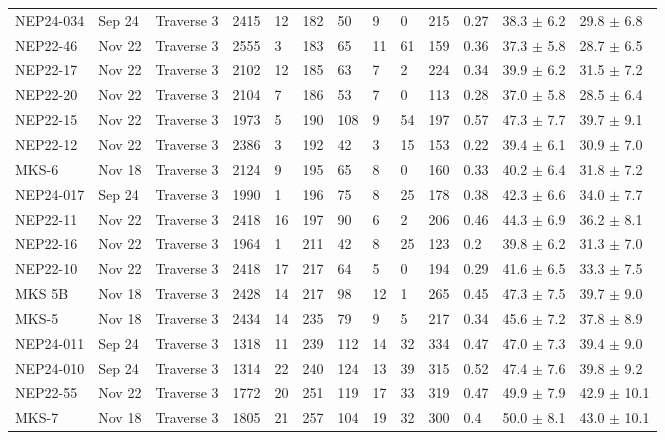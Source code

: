 \begin{landscape}
{\begin{longtable}{l l l l l l l l l l l l l}
    NEP24-034 & Sep 24 & Traverse 3 & 2415 & 12 & 182 & 50 & 9 & 0 & 215 & 0.27 & 38.3 $\pm$ 6.2 & 29.8 $\pm$ 6.8 \\
    NEP22-46 & Nov 22 & Traverse 3 & 2555 & 3 & 183 & 65 & 11 & 61 & 159 & 0.36 & 37.3 $\pm$ 5.8 & 28.7 $\pm$ 6.5 \\
    NEP22-17 & Nov 22 & Traverse 3 & 2102 & 12 & 185 & 63 & 7 & 2 & 224 & 0.34 & 39.9 $\pm$ 6.2 & 31.5 $\pm$ 7.2 \\
    NEP22-20 & Nov 22 & Traverse 3 & 2104 & 7 & 186 & 53 & 7 & 0 & 113 & 0.28 & 37.0 $\pm$ 5.8 & 28.5 $\pm$ 6.4 \\
    NEP22-15 & Nov 22 & Traverse 3 & 1973 & 5 & 190 & 108 & 9 & 54 & 197 & 0.57 & 47.3 $\pm$ 7.7 & 39.7 $\pm$ 9.1 \\
    NEP22-12 & Nov 22 & Traverse 3 & 2386 & 3 & 192 & 42 & 3 & 15 & 153 & 0.22 & 39.4 $\pm$ 6.1 & 30.9 $\pm$ 7.0 \\
    MKS-6 & Nov 18 & Traverse 3 & 2124 & 9 & 195 & 65 & 8 & 0 & 160 & 0.33 & 40.2 $\pm$ 6.4 & 31.8 $\pm$ 7.2 \\
    NEP24-017 & Sep 24 & Traverse 3 & 1990 & 1 & 196 & 75 & 8 & 25 & 178 & 0.38 & 42.3 $\pm$ 6.6 & 34.0 $\pm$ 7.7 \\
    NEP22-11 & Nov 22 & Traverse 3 & 2418 & 16 & 197 & 90 & 6 & 2 & 206 & 0.46 & 44.3 $\pm$ 6.9 & 36.2 $\pm$ 8.1 \\
    NEP22-16 & Nov 22 & Traverse 3 & 1964 & 1 & 211 & 42 & 8 & 25 & 123 & 0.2 & 39.8 $\pm$ 6.2 & 31.3 $\pm$ 7.0 \\
    NEP22-10 & Nov 22 & Traverse 3 & 2418 & 17 & 217 & 64 & 5 & 0 & 194 & 0.29 & 41.6 $\pm$ 6.5 & 33.3 $\pm$ 7.5 \\
    MKS 5B & Nov 18 & Traverse 3 & 2428 & 14 & 217 & 98 & 12 & 1 & 265 & 0.45 & 47.3 $\pm$ 7.5 & 39.7 $\pm$ 9.0 \\
    MKS-5 & Nov 18 & Traverse 3 & 2434 & 14 & 235 & 79 & 9 & 5 & 217 & 0.34 & 45.6 $\pm$ 7.2 & 37.8 $\pm$ 8.9 \\
    NEP24-011 & Sep 24 & Traverse 3 & 1318 & 11 & 239 & 112 & 14 & 32 & 334 & 0.47 & 47.0 $\pm$ 7.3 & 39.4 $\pm$ 9.0 \\
    NEP24-010 & Sep 24 & Traverse 3 & 1314 & 22 & 240 & 124 & 13 & 39 & 315 & 0.52 & 47.4 $\pm$ 7.6 & 39.8 $\pm$ 9.2 \\
    NEP22-55 & Nov 22 & Traverse 3 & 1772 & 20 & 251 & 119 & 17 & 33 & 319 & 0.47 & 49.9 $\pm$ 7.9 & 42.9 $\pm$ 10.1 \\
    MKS-7 & Nov 18 & Traverse 3 & 1805 & 21 & 257 & 104 & 19 & 32 & 300 & 0.4 & 50.0 $\pm$ 8.1 & 43.0 $\pm$ 10.1 \\

\end{longtable}}
\end{landscape}
